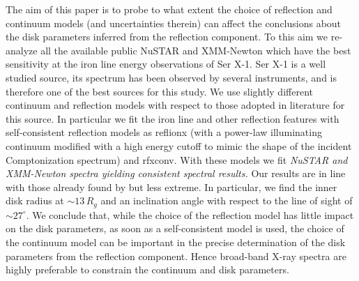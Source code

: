 \documentclass{aa}
\begin{document}
   {The aim of this paper is to probe to what extent the choice of reflection 
and continuum models (and uncertainties therein) can affect the conclusions about the 
disk parameters inferred from the reflection component. To this aim we re-analyze all 
the available public NuSTAR and XMM-Newton which have the best sensitivity at the 
iron line energy observations of Ser X-1. Ser X-1 is a well studied source, its
spectrum has been observed by several instruments, and is therefore one of the best 
sources for this study.}
   {We use slightly different continuum and reflection models with
respect to those adopted in literature for this source. In particular
we fit the iron line and other reflection features with self-consistent
reflection models as reflionx  (with a power-law illuminating continuum 
modified with a high energy cutoff to mimic the shape of the incident Comptonization
spectrum) and rfxconv. With these models we fit
\emph{NuSTAR and \emph{XMM-Newton} spectra yielding consistent spectral results.}}
   {Our results are in line with those already found by \citet{Miller.etal:13} 
but less extreme. In particular, we find the inner disk radius at $\sim 13 \, R_g$
and an inclination angle with respect to the line of sight of $\sim 27^\circ$. 
We conclude that, while the choice of the reflection model has little impact
on the disk parameters, as soon as a self-consistent model is used, the choice of 
the continuum model can be important in the precise determination of the disk 
parameters from the reflection component. Hence broad-band X-ray spectra are highly 
preferable to constrain the continuum and disk parameters.}
   {}


   \maketitle

\end{document}

